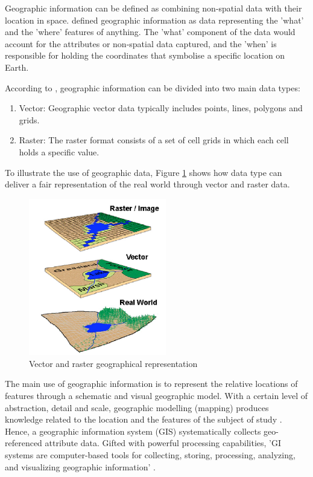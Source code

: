 \documentclass[12pt, a4paper]{report}
\begin{document}
Geographic information can be defined as combining non-spatial data with their location in space. \cite{longleyGeographicInformationScience2015} defined geographic information as data representing the 'what' and the 'where' features of anything. The 'what' component of the data would account for the attributes or non-spatial data captured, and the 'when' is responsible for holding the coordinates that symbolise a specific location on Earth.

According to \cite{maclachlanAppliedGeographicInformation2022}, geographic information can be divided into two main data types:

\begin{enumerate}
  \item Vector: Geographic vector data typically includes points, lines, polygons and grids.
  \item Raster: The raster format consists of a set of cell grids in which each cell holds a specific value. 
\end{enumerate}

To illustrate the use of geographic data, Figure \ref{fig:Fig_data_types} shows how data type can deliver a fair representation of the real world through vector and raster data.

\begin{figure}[htp]
    \centering
    \includegraphics[width=6cm]{Images/Fig_Types_Geodata.png}
    \caption{Vector and raster geographical representation \citep{saabConceptualizingSpaceMapping2003}}
    \label{fig:Fig_data_types}
\end{figure}



The main use of geographic information is to represent the relative locations of features through a schematic and visual geographic model. With a certain level of abstraction, detail and scale, geographic modelling (mapping) produces knowledge related to the location and the features of the subject of study \citep{longleyGeographicInformationScience2015}. Hence, a geographic information system (GIS) systematically collects geo-referenced attribute data. Gifted with powerful processing capabilities, 'GI systems are computer-based tools for collecting, storing, processing, analyzing, and visualizing geographic information' \citep{longleyGeographicInformationScience2015}.
\end{document}
